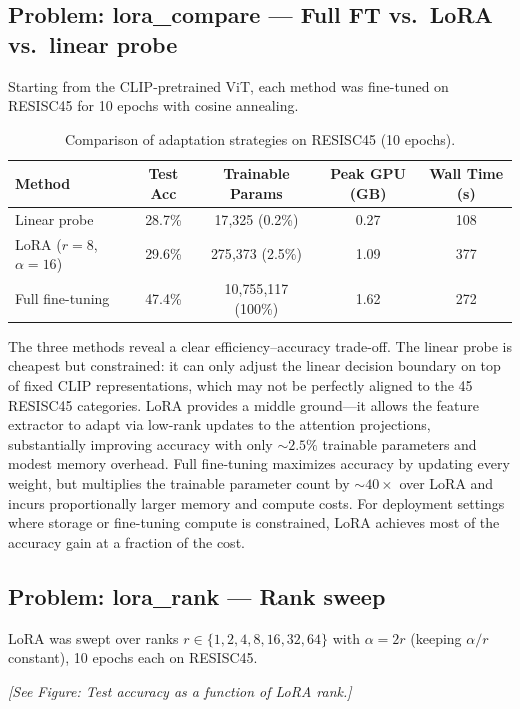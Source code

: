 \documentclass[11pt]{article}
\begin{document}
\subsection*{Problem: lora\_compare --- Full FT vs.\ LoRA vs.\ linear probe}

Starting from the CLIP-pretrained ViT, each method was fine-tuned on
RESISC45 for 10 epochs with cosine annealing.

\begin{table}[H]
\centering
\caption{Comparison of adaptation strategies on RESISC45 (10 epochs).}
\begin{tabular}{lcccc}
\toprule
Method & Test Acc & Trainable Params & Peak GPU (GB) & Wall Time (s) \\
\midrule
Linear probe            & 28.7\% & 17{,}325 (0.2\%)           & 0.27 & 108 \\
LoRA ($r=8$, $\alpha=16$) & 29.6\% & 275{,}373 (2.5\%)        & 1.09 & 377 \\
Full fine-tuning        & 47.4\% & 10{,}755{,}117 (100\%)     & 1.62 & 272 \\
\bottomrule
\end{tabular}
\end{table}

The three methods reveal a clear efficiency--accuracy trade-off. The linear
probe is cheapest but constrained: it can only adjust the linear decision
boundary on top of fixed CLIP representations, which may not be perfectly
aligned to the 45 RESISC45 categories. LoRA provides a middle ground---it
allows the feature extractor to adapt via low-rank updates to the attention
projections, substantially improving accuracy with only ${\sim}2.5\%$ trainable
parameters and modest memory overhead. Full fine-tuning maximizes accuracy by
updating every weight, but multiplies the trainable parameter count by
${\sim}40{\times}$ over LoRA and incurs proportionally larger memory and compute
costs. For deployment settings where storage or fine-tuning compute is
constrained, LoRA achieves most of the accuracy gain at a fraction of the cost.

\subsection*{Problem: lora\_rank --- Rank sweep}

LoRA was swept over ranks $r \in \{1, 2, 4, 8, 16, 32, 64\}$ with
$\alpha = 2r$ (keeping $\alpha/r$ constant), 10 epochs each on RESISC45.

\textit{[See Figure: Test accuracy as a function of LoRA rank.]}
\end{document}
